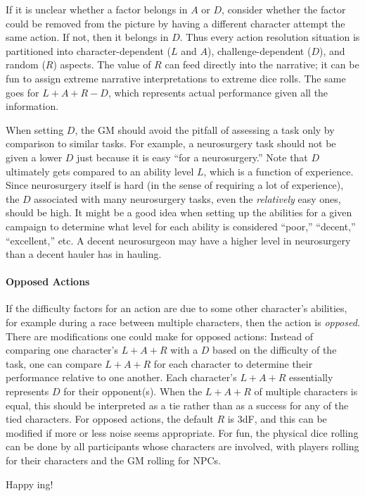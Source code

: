 If it is unclear whether a factor belongs in $A$ or $D$, consider whether the factor could be removed from the picture by having a different character attempt the same action. If not, then it belongs in $D$.
Thus every action resolution situation is partitioned into
character-dependent ($L$ and $A$), challenge-dependent ($D$), and random ($R$) aspects.
The value of $R$ can feed directly into the narrative; it can be fun to assign extreme narrative interpretations to extreme dice rolls.
The same goes for $L + A + R - D$, which represents actual performance given all the information.


When setting $D$, the GM should avoid the pitfall of assessing a task only by comparison to similar tasks.
For example, a neurosurgery task should not be given a lower $D$ just because it is easy ``for a neurosurgery.''
Note that $D$ ultimately gets compared to an ability level $L$, which is a function of experience.
Since neurosurgery itself is hard (in the sense of requiring a lot of experience), the $D$ associated with many neurosurgery tasks, even the \emph{relatively} easy ones, should be high.
It might be a good idea when setting up the abilities for a given campaign to determine what level for each ability is considered ``poor,'' ``decent,'' ``excellent,'' etc.
A decent neurosurgeon may have a higher level in neurosurgery than a decent hauler has in hauling.

\paragraph{Opposed Actions}
If the difficulty factors for an action are due to some other character’s abilities, for example during a race between multiple characters, then the action is \emph{opposed}. There are modifications one could make for opposed actions: Instead of comparing one character’s $L + A + R$ with a $D$ based on the difficulty of the task, one can compare $L + A + R$ for each character to determine their performance relative to one another. Each character's $L + A + R$ essentially represents $D$ for their opponent(s). When the $L + A + R$ of multiple characters is equal, this should be interpreted as a tie rather than as a success for any of the tied characters. For opposed actions, the default $R$ is $3$dF, and this can be modified if more or less noise seems appropriate. For fun, the physical dice rolling can be done by all participants whose characters are involved, with players rolling for their characters and the GM rolling for NPCs.

Happy \peupfudge{}ing!

